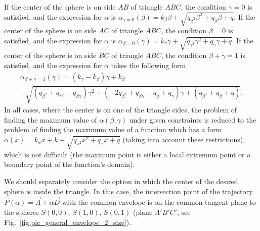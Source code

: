 \documentclass[
11pt,%
tightenlines,%
twoside,%
onecolumn,%
nofloats,%
nobibnotes,%
nofootinbib,%
superscriptaddress,%
noshowpacs,%
centertags]%
{revtex4-2}
\begin{document}
If the center of the sphere is on side $AB$ of triangle  $ABC$, the
condition $\gamma = 0$ is satisfied, and the expression for $\alpha$
is $\alpha_{\gamma = 0}(\beta) = k_{\beta} \beta + \sqrt{q_{\beta^2}
\beta^2 + q_{\beta} \beta + q}$.
If the center of the sphere is on side $AC$ of triangle $ABC$,  the
condition $\beta = 0$ is satisfied, and the expression for $\alpha$
is $\alpha_{\beta = 0}(\gamma) = k_{\gamma} \gamma +
\sqrt{q_{\gamma^2} \gamma^2 + q_{\gamma} \gamma + q}$.
If the center of the sphere is on side $BC$ of triangle $ABC$,  the
condition $\beta + \gamma = 1$ is satisfied, and the expression for
$\alpha$ takes the following form
\begin{multline}
\alpha_{\beta + \gamma = 1}(\gamma) = (k_{\gamma} - k_{\beta}) \gamma + k_{\beta}  \\
+\sqrt{(q_{\beta^2} + q_{\gamma^2} - q_{\beta \gamma}) \gamma^2 +
(-2 q_{\beta^2} + q_{\beta \gamma} - q_{\beta} + q_{\gamma}) \gamma
+ (q_{\beta^2} + q_{\beta} + q)}.
\end{multline}
In all cases, where the center is on one of the triangle sides, the
problem of finding the maximum value of $\alpha(\beta, \gamma)$
under given constraints is reduced to the problem of finding the
maximum value of a function which has a form $\alpha(x) = k_x x + k
+ \sqrt {q_{x^2} x^2 + q_x x + q}$ (taking into account these
restrictions), which is not difficult (the maximum point is either a
local extremum point or a boundary point of the function's domain).

We should separately consider the option in which the center of  the
desired sphere is inside the triangle.
In this case, the intersection point of the trajectory
$\vec{P}(\alpha) = \vec{A} + \alpha \vec{D}$ with the common
envelope is on the common tangent plane to the spheres $S(0, 0)$,
$S(1, 0)$, $S(0, 1)$ (plane $A'B'C'$, see
Fig.~\ref{fig:pic_general_envelope_2_size}).
\end{document}
